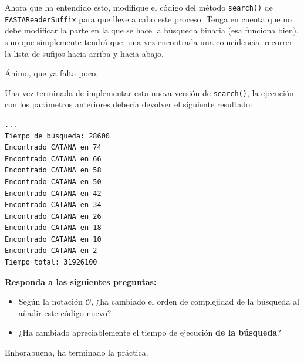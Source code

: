 \documentclass[10pt,a4paper,spanish]{article}
\newcommand{\code}[1]{\texttt{#1}}
\newcommand{\bigO}{\mathcal{O}}
\begin{document}
Ahora que ha entendido esto, modifique el código del método \code{search()} de \code{FASTAReaderSuffix} para que lleve a cabo este proceso. Tenga en cuenta que no debe modificar la parte en la que se hace la búsqueda binaria (esa funciona bien), sino que simplemente tendrá que, una vez encontrada una coincidencia, recorrer la lista de sufijos hacia arriba y hacia abajo.

Ánimo, que ya falta poco.

Una vez terminada de implementar esta nueva versión de \code{search()}, la ejecución con los parámetros anteriores debería devolver el siguiente resultado:

\begin{verbatim}
...
Tiempo de búsqueda: 28600
Encontrado CATANA en 74
Encontrado CATANA en 66
Encontrado CATANA en 58
Encontrado CATANA en 50
Encontrado CATANA en 42
Encontrado CATANA en 34
Encontrado CATANA en 26
Encontrado CATANA en 18
Encontrado CATANA en 10
Encontrado CATANA en 2
Tiempo total: 31926100
\end{verbatim}

\textbf{Responda a las siguientes preguntas:}

\begin{itemize}
    \item Según la notación $\bigO$, ¿ha cambiado el orden de complejidad de la búsqueda al añadir este código nuevo?
    \item ¿Ha cambiado apreciablemente el tiempo de ejecución \textbf{de la búsqueda}?
\end{itemize}

Enhorabuena, ha terminado la práctica.
\end{document}
